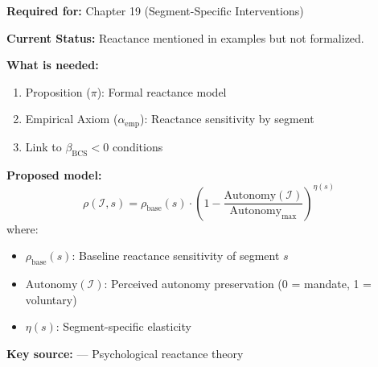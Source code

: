 \begin{tcolorbox}[colback=green!5!white, colframe=green!75!black,
    title=\textbf{TODO-UNMAPPED_IE-7: Reactance Model $\rho(\mathcal{I}, s)$}]

\textbf{Required for:} Chapter 19 (Segment-Specific Interventions)

\textbf{Current Status:} Reactance mentioned in examples but not formalized.

\textbf{What is needed:}
\begin{enumerate}[nosep]
    \item Proposition ($\pi$): Formal reactance model
    \item Empirical Axiom ($\alpha_{\text{emp}}$): Reactance sensitivity by segment
    \item Link to $\beta_{\text{BCS}} < 0$ conditions
\end{enumerate}

\textbf{Proposed model:}
\[
\rho(\mathcal{I}, s) = \rho_{\text{base}}(s) \cdot \left(1 - \frac{\text{Autonomy}(\mathcal{I})}{\text{Autonomy}_{\max}}\right)^{\eta(s)}
\]
where:
\begin{itemize}[nosep]
    \item $\rho_{\text{base}}(s)$: Baseline reactance sensitivity of segment $s$
    \item $\text{Autonomy}(\mathcal{I})$: Perceived autonomy preservation (0 = mandate, 1 = voluntary)
    \item $\eta(s)$: Segment-specific elasticity
\end{itemize}

\textbf{Key source:} \citet{brehm1966theory} --- Psychological reactance theory

\end{tcolorbox}

